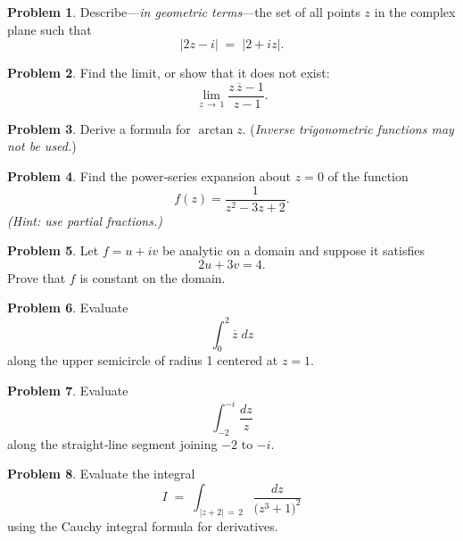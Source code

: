 \documentclass[10pt]{article}
\theoremstyle{definition} %
\newtheorem{problem}{Problem}
\theoremstyle{plain} %
\begin{document}
            \begin{problem}
            Describe—\emph{in geometric terms}—the set of all points \(z\) in the complex plane such that
            \[
              \lvert 2z - i\rvert \;=\; \lvert 2 + iz\rvert .
            \]
            \end{problem}
            
            \begin{problem}
            Find the limit, or show that it does not exist:
            \[
              \lim_{z \,\to\, 1} \frac{z\,\overline{z}-1}{\,z-1}.
            \]
            \end{problem}
            
            \begin{problem}
            Derive a formula for \(\operatorname{arctan} z\).  
            (\emph{Inverse trigonometric functions may not be used.})
            \end{problem}
            \begin{problem}
              Find the power‑series expansion about \(z=0\) of the function
              \[
                f(z)=\frac{1}{z^{2}-3z+2}.
              \]
              \emph{(Hint: use partial fractions.)}
              \end{problem}
              
              \begin{problem}
              Let \(f=u+iv\) be analytic on a domain and suppose it satisfies
              \[
                2u+3v = 4.
              \]
              Prove that \(f\) is constant on the domain.
              \end{problem}
              
              \begin{problem}
              Evaluate
              \[
                \int_{0}^{2} \overline{z}\;dz
              \]
              along the upper semicircle of radius 1 centered at \(z=1\).
              \end{problem}
              
              \begin{problem}
              Evaluate
              \[
                \int_{-2}^{-i} \frac{dz}{z}
              \]
              along the straight‑line segment joining \(-2\) to \(-i\).
              \end{problem}
              \begin{problem}
                Evaluate the integral
                \[
                  I \;=\; \int_{\,|z+2|\,=\,2} \frac{dz}{\bigl(z^{3}+1\bigr)^{2}}
                \]
                using the Cauchy integral formula for derivatives.
                \end{problem}
                
\end{document}
